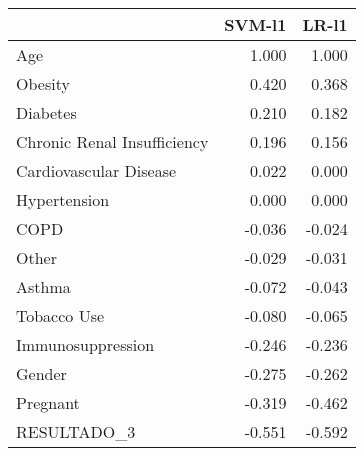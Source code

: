 \begin{tabular}{lrr}
\toprule
{} &  SVM-l1 &  LR-l1 \\
\midrule
Age                         &   1.000 &  1.000 \\
Obesity                     &   0.420 &  0.368 \\
Diabetes                    &   0.210 &  0.182 \\
Chronic Renal Insufficiency &   0.196 &  0.156 \\
Cardiovascular Disease      &   0.022 &  0.000 \\
Hypertension                &   0.000 &  0.000 \\
COPD                        &  -0.036 & -0.024 \\
Other                       &  -0.029 & -0.031 \\
Asthma                      &  -0.072 & -0.043 \\
Tobacco Use                 &  -0.080 & -0.065 \\
Immunosuppression           &  -0.246 & -0.236 \\
Gender                      &  -0.275 & -0.262 \\
Pregnant                    &  -0.319 & -0.462 \\
RESULTADO\_3                 &  -0.551 & -0.592 \\
\bottomrule
\end{tabular}
